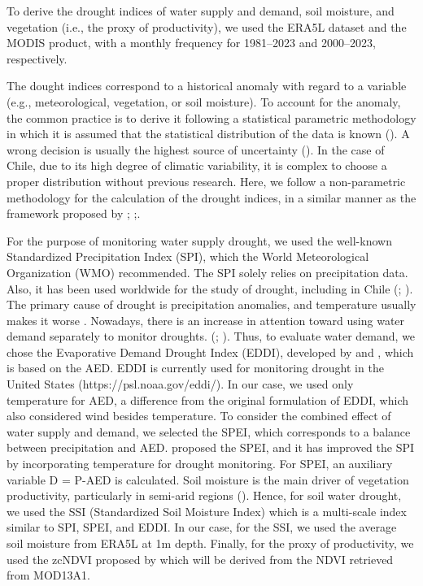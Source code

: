 \documentclass[
  authoryear,
  preprint,
  3p,
  onecolumn]{elsarticle}
\begin{document}
To derive the drought indices of water supply and demand, soil moisture,
and vegetation (i.e., the proxy of productivity), we used the ERA5L
dataset and the MODIS product, with a monthly frequency for 1981--2023
and 2000--2023, respectively.

The dought indices correspond to a historical anomaly with regard to a
variable (e.g., meteorological, vegetation, or soil moisture). To
account for the anomaly, the common practice is to derive it following a
statistical parametric methodology in which it is assumed that the
statistical distribution of the data is known (\citet{Heim2002}). A
wrong decision is usually the highest source of uncertainty
(\citet{Laimighofer2022}). In the case of Chile, due to its high degree
of climatic variability, it is complex to choose a proper distribution
without previous research. Here, we follow a non-parametric methodology
for the calculation of the drought indices, in a similar manner as the
framework proposed by \citet{Farahmand2015};
\citet{Hobbins2016};\citet{McEvoy2016}.

For the purpose of monitoring water supply drought, we used the
well-known Standardized Precipitation Index (SPI), which the World
Meteorological Organization (WMO) recommended. The SPI solely relies on
precipitation data. Also, it has been used worldwide for the study of
drought, including in Chile (\citet{Garreaud2017};
\citet{Zambrano2017}). The primary cause of drought is precipitation
anomalies, and temperature usually makes it worse \citep{Luo2017}.
Nowadays, there is an increase in attention toward using water demand
separately to monitor droughts. (\citet{Vicente-Serrano2020};
\citet{Noguera2022}). Thus, to evaluate water demand, we chose the
Evaporative Demand Drought Index (EDDI), developed by
\citet{Hobbins2016} and \citet{McEvoy2016}, which is based on the AED.
EDDI is currently used for monitoring drought in the United States
(https://psl.noaa.gov/eddi/). In our case, we used only temperature for
AED, a difference from the original formulation of EDDI, which also
considered wind besides temperature. To consider the combined effect of
water supply and demand, we selected the SPEI, which corresponds to a
balance between precipitation and AED. \citet{Vicente-Serrano2010}
proposed the SPEI, and it has improved the SPI by incorporating
temperature for drought monitoring. For SPEI, an auxiliary variable D =
P-AED is calculated. Soil moisture is the main driver of vegetation
productivity, particularly in semi-arid regions (\citet{Li2022}). Hence,
for soil water drought, we used the SSI (Standardized Soil Moisture
Index) \citep{Hao2013, AghaKouchak2014} which is a multi-scale index
similar to SPI, SPEI, and EDDI. In our case, for the SSI, we used the
average soil moisture from ERA5L at 1m depth. Finally, for the proxy of
productivity, we used the zcNDVI proposed by \citet{Zambrano2018} which
will be derived from the NDVI retrieved from MOD13A1.
\end{document}
